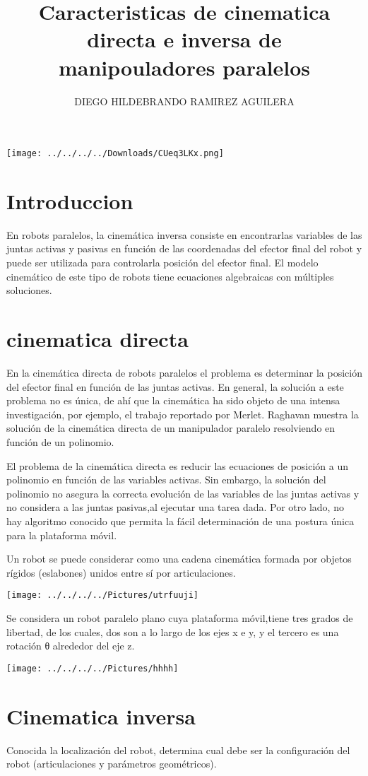 \documentclass[12pt,a4paper]{article}
\author{DIEGO HILDEBRANDO RAMIREZ AGUILERA}
\title{Caracteristicas de cinematica directa e inversa de manipouladores paralelos}
\begin{document}
\maketitle
\texttt{[image: ../../../../Downloads/CUeq3LKx.png]} 

\clearpage

\section{Introduccion}
En robots paralelos, la cinemática inversa consiste en encontrarlas variables de las juntas activas y pasivas en función de las coordenadas del efector final del robot y puede ser utilizada para controlarla posición del efector final. El modelo cinemático de este tipo de robots tiene ecuaciones algebraicas con múltiples soluciones.
\section{cinematica directa}
En la cinemática directa de robots paralelos el problema es determinar la posición del efector final en función de las juntas activas. En general, la solución a este problema no es única, de ahí que la cinemática ha sido objeto de una intensa investigación, por ejemplo, el trabajo reportado por Merlet. Raghavan muestra la solución de la cinemática directa de un manipulador paralelo resolviendo en función de un polinomio.

El problema de la cinemática directa es reducir las ecuaciones de posición a un polinomio en función de las variables activas. Sin embargo, la solución del polinomio no asegura la correcta evolución de las variables de las juntas activas y no considera a las juntas pasivas,al ejecutar una tarea dada. Por otro lado, no hay algoritmo conocido que permita la fácil determinación de una postura única para la plataforma móvil.

Un robot se puede considerar como una cadena
cinemática formada por objetos rígidos (eslabones)
unidos entre sí por articulaciones.

\texttt{[image: ../../../../Pictures/utrfuuji]} 

Se considera un robot paralelo plano cuya plataforma móvil,tiene tres grados de libertad, de los cuales, dos son a lo largo de los ejes x e y, y el tercero es una rotación θ alrededor del eje z.

\texttt{[image: ../../../../Pictures/hhhh]} 

\section{Cinematica inversa}
Conocida la localización del robot, determina cual debe
ser la configuración del robot (articulaciones y
parámetros geométricos).
\end{document}
